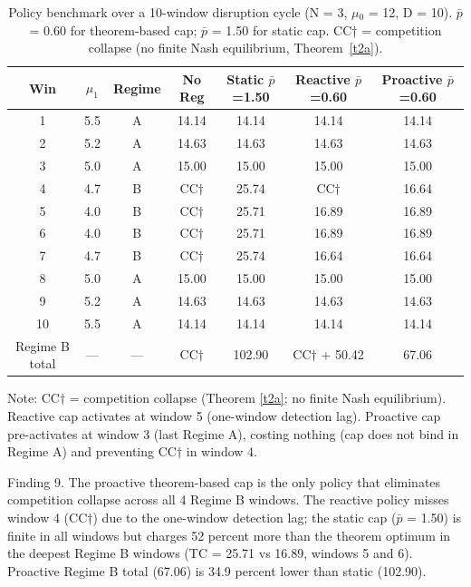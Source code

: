 \documentclass[review,3p,authoryear]{elsarticle}
\begin{document}
\begin{table}[!ht]
\centering
\caption{Policy benchmark over a 10-window disruption cycle (N = 3, \ensuremath{\mu}\ensuremath{_{0}} = 12, D = 10). \ensuremath{\bar{p}} = 0.60 for theorem-based cap; \ensuremath{\bar{p}} = 1.50 for static cap. CC† = competition collapse (no finite Nash equilibrium, Theorem~\ref{t2a}).}
\label{tab:9}
\begin{tabular}{@{}ccccccc@{}}
\toprule
\textbf{Win} & \textbf{$\mu_1$} & \textbf{Regime} & \textbf{No Reg} & \textbf{Static $\bar{p}$=1.50} & \textbf{Reactive $\bar{p}$=0.60} & \textbf{Proactive $\bar{p}$=0.60} \\ \midrule
1 & 5.5 & A & 14.14 & 14.14 & 14.14 & 14.14 \\
2 & 5.2 & A & 14.63 & 14.63 & 14.63 & 14.63 \\
3 & 5.0 & A & 15.00 & 15.00 & 15.00 & 15.00 \\
4 & 4.7 & B & CC$\dagger$ & 25.74 & CC$\dagger$ & 16.64 \\
5 & 4.0 & B & CC$\dagger$ & 25.71 & 16.89 & 16.89 \\
6 & 4.0 & B & CC$\dagger$ & 25.71 & 16.89 & 16.89 \\
7 & 4.7 & B & CC$\dagger$ & 25.74 & 16.64 & 16.64 \\
8 & 5.0 & A & 15.00 & 15.00 & 15.00 & 15.00 \\
9 & 5.2 & A & 14.63 & 14.63 & 14.63 & 14.63 \\
10 & 5.5 & A & 14.14 & 14.14 & 14.14 & 14.14 \\
Regime B total & — & — & CC$\dagger$ & 102.90 & CC$\dagger$ + 50.42 & 67.06 \\ \bottomrule
\end{tabular}
\end{table}
Note: CC$\dagger$ = competition collapse (Theorem \ref{t2a}; no finite Nash equilibrium). Reactive cap activates at window 5 (one-window detection lag). Proactive cap pre-activates at window 3 (last Regime A), costing nothing (cap does not bind in Regime A) and preventing CC$\dagger$ in window 4.

Finding 9. The proactive theorem-based cap is the only policy that eliminates competition collapse across all 4 Regime B windows. The reactive policy misses window 4 (CC$\dagger$) due to the one-window detection lag; the static cap (\ensuremath{\bar{p}} = 1.50) is finite in all windows but charges 52 percent more than the theorem optimum in the deepest Regime B windows (TC = 25.71 vs 16.89, windows 5 and 6). Proactive Regime B total (67.06) is 34.9 percent lower than static (102.90).
\end{document}
